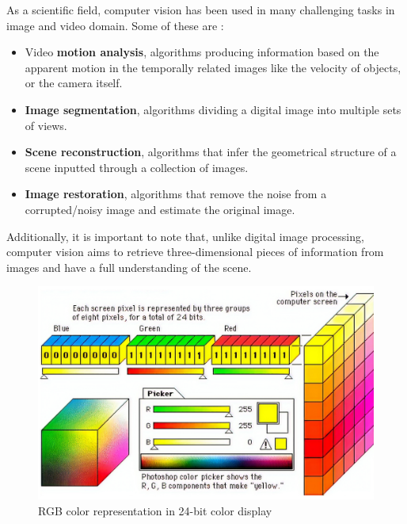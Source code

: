 As a scientific field, computer vision has been used in many challenging tasks in image and video domain.  Some of these are :
\begin{itemize}
\item Video \textbf{motion analysis}, algorithms producing information based on the apparent motion in the temporally related images like the velocity of objects, or the camera itself.
\item \textbf{Image segmentation}, algorithms dividing a digital image into multiple sets of views.
\item \textbf{Scene reconstruction}, algorithms  that  infer the geometrical  structure of a scene inputted through  a collection of images.
\item \textbf{Image restoration}, algorithms  that  remove the  noise from a corrupted/noisy image and estimate  the original image. 
\end{itemize}
Additionally, it is important to note that, unlike digital image processing,  computer vision aims to retrieve three-dimensional pieces of information from images and have a full understanding of the scene.\\
\begin{figure}[t]
	\centering
	\includegraphics[width=0.8\linewidth]{figures/rgb}
	\caption{RGB color representation in 24-bit color display}
	\label{fig:rgb}
\end{figure}

